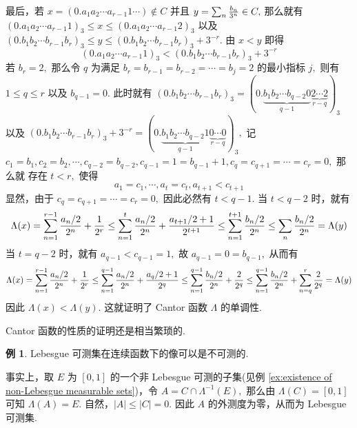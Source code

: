\documentclass[12pt, a4paper, oneside]{book}
\numberwithin{figure}{section}
\theoremstyle{definition}
\newtheorem{example}[theorem]{例}
\begin{document}
最后，若 $x=(0.a_1a_2\cdots a_{r-1}1\cdots)\notin C$ 并且 $y=\sum_n {b_n\over 3^n}\in C,$ 那么就有
$(0.a_1a_2\cdots a_{r-1}1)_3\leq x\leq (0.a_1a_2\cdots a_{r-1}2)_3$ 以及 
$(0.b_1b_2\cdots b_{r-1}b_r)_3\leq y\leq (0.b_1b_2\cdots b_{r-1}b_r)_3+3^{-r}.$ 由 $x<y$ 即得
\begin{equation}
   (0.a_1a_2\cdots a_{r-1}1)_3<(0.b_1b_2\cdots b_{r-1}b_r)_3+3^{-r}
\end{equation}
若 $b_r=2,$ 那么令 $q$ 为满足 $b_r=b_{r-1}=b_{r-2}=\cdots=b_j=2$ 的最小指标 $j,$ 则有 $1\leq q\leq r$ 以及 $b_{q-1}=0.$ 此时就有
$(0.b_1b_2\cdots b_{r-1}b_r)_3=(0.\underbrace{b_1b_2\cdots b_{q-2}0}_{q-1}\underbrace{2\cdots 2}_{r-q})_3$ 以及
$(0.b_1b_2\cdots b_{r-1}b_r)_3+3^{-r}=(0.\underbrace{b_1b_2\cdots b_{q-2}1}_{q-1}\underbrace{0\cdots 0}_{r-q})_3,$
记 $c_1=b_1,c_2=b_2,\cdots,c_{q-2}=b_{q-2},c_{q-1}=1=b_{q-1}+1,c_{q}=c_{q+1}=\cdots=c_r=0,$ 那么就
存在 $t< r,$ 使得 
\begin{equation}
   a_1=c_1,\cdots,a_{t}=c_{t},a_{t+1}<c_{t+1}
\end{equation}
显然，由于 $c_{q}=c_{q+1}=\cdots=c_r=0,$ 因此必然有 $t<q-1.$ 
当 $t<q-2$ 时，就有
\begin{equation}
   \Lambda(x)=\sum_{n=1}^{r-1}{a_n/2\over 2^n}+{1\over 2^r}\leq\sum_{n=1}^t {a_n/2\over 2^n}+{a_{t+1}/2+1\over 2^{t+1}}\leq\sum_{n=1}^{t+1}{b_n/2\over 2^n}\leq\sum_{n}{b_n/2\over 2^n}=\Lambda(y)
\end{equation}
当 $t=q-2$ 时，就有 $a_{q-1}<c_{q-1}=1,$ 故 $a_{q-1}=0=b_{q-1},$ 从而有
\begin{equation}
   \Lambda(x)=\sum_{n=1}^{r-1}{a_n/2\over 2^n}+{1\over 2^r}\leq\sum_{n=1}^{q-1} {a_n/2\over 2^n}+{a_{q}/2+1\over 2^{q}}\leq \sum_{n=1}^{q-1}{b_n/2\over 2^n}+{2\over 2^q}\leq \sum_{n=1}^{q-1}{b_n/2\over 2^n}+\sum_{n=q}^r{2\over 2^q}=\Lambda(y)
\end{equation}
因此 $\Lambda(x)<\Lambda(y).$ 这就证明了 Cantor 函数 $\Lambda$ 的单调性.

Cantor 函数的性质的证明还是相当繁琐的.

\begin{example}
    Lebesgue 可测集在连续函数下的像可以是不可测的.
\end{example}

事实上，取 $E$ 为 $[0,1]$ 的一个非 Lebesgue 可测的子集(见例 \ref{ex:existence of non-Lebesgue measurable sets})，令 $A=C\cap\Lambda^{-1}(E),$ 那么由 $\Lambda(C)=[0,1]$ 可知 $\Lambda(A)=E.$ 
自然，$|A|\leq |C|=0.$ 因此 $A$ 的外测度为零，从而为 Lebesgue 可测集. 
\end{document}
